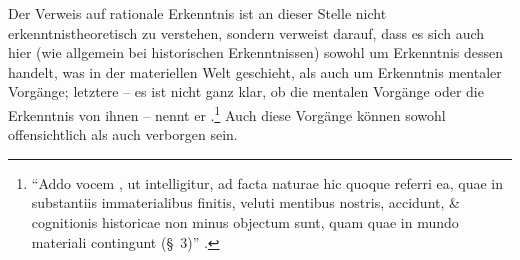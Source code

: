 Der Verweis auf rationale Erkenntnis ist an dieser Stelle nicht
erkenntnistheoretisch zu verstehen, sondern verweist darauf, dass es sich auch
hier (wie allgemein bei historischen Erkenntnissen) sowohl um Erkenntnis dessen
handelt, was in der materiellen Welt geschieht, als auch um
Erkenntnis mentaler Vorgänge; letztere -- es ist nicht ganz klar, ob die mentalen Vorgänge oder die
Erkenntnis von ihnen -- nennt er
.\footnote{\enquote{Addo vocem , ut intelligitur, ad facta naturae hic
quoque referri ea, quae in substantiis immaterialibus finitis, veluti mentibus
nostris, accidunt, {\&} cognitionis historicae non minus objectum sunt, quam
quae in mundo materiali contingunt (\S~3)}
\parencite[][\S~21]{Wolff:Discursuspraeliminarisdephilosophiaingenere1996}.}
Auch diese Vorgänge können sowohl offensichtlich als auch verborgen sein.


